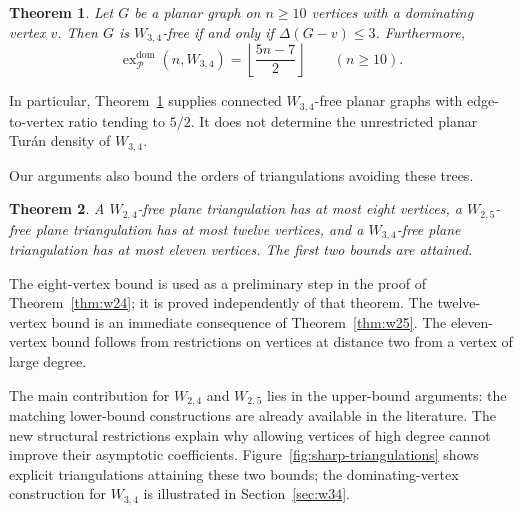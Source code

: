 \documentclass[11pt,a4paper]{article}
\newtheorem{theorem}{Theorem}[section]
\theoremstyle{remark}
\newcommand{\ex}{\operatorname{ex}}
\newcommand{\PP}{\mathcal P}
\begin{document}
\begin{theorem}\label{thm:w34}
Let $G$ be a planar graph on $n\ge10$ vertices with a dominating vertex $v$. Then $G$ is $W_{3,4}$-free if and only if $\Delta(G-v)\le3$. Furthermore,
\[
\ex^{\mathrm{dom}}_{\PP}(n,W_{3,4})
=\left\lfloor\frac{5n-7}{2}\right\rfloor
\qquad(n\ge10).
\]
\end{theorem}

In particular, Theorem~\ref{thm:w34} supplies connected $W_{3,4}$-free planar graphs with edge-to-vertex ratio tending to $5/2$. It does not determine the unrestricted planar Tur\'an density of $W_{3,4}$.

Our arguments also bound the orders of triangulations avoiding these trees.

\begin{theorem}\label{thm:triangles}
A $W_{2,4}$-free plane triangulation has at most eight vertices, a $W_{2,5}$-free plane triangulation has at most twelve vertices, and a $W_{3,4}$-free plane triangulation has at most eleven vertices. The first two bounds are attained.
\end{theorem}

The eight-vertex bound is used as a preliminary step in the proof of Theorem~\ref{thm:w24}; it is proved independently of that theorem. The twelve-vertex bound is an immediate consequence of Theorem~\ref{thm:w25}. The eleven-vertex bound follows from restrictions on vertices at distance two from a vertex of large degree.

The main contribution for $W_{2,4}$ and $W_{2,5}$ lies in the upper-bound arguments: the matching lower-bound constructions are already available in the literature. The new structural restrictions explain why allowing vertices of high degree cannot improve their asymptotic coefficients. Figure~\ref{fig:sharp-triangulations} shows explicit triangulations attaining these two bounds; the dominating-vertex construction for $W_{3,4}$ is illustrated in Section~\ref{sec:w34}.
\end{document}
